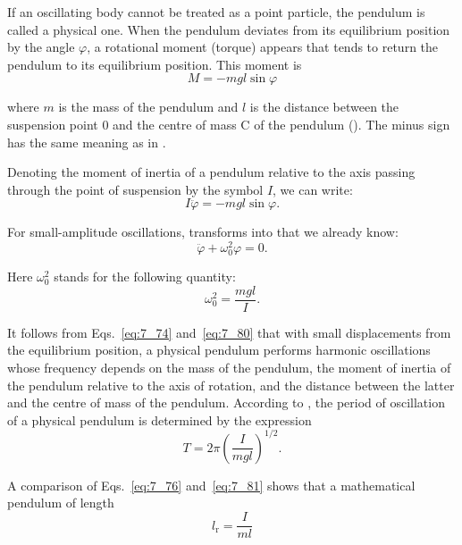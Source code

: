 If an oscillating body cannot be treated as a point particle, the pendulum is called a physical one. When the pendulum deviates from its equilibrium position by the angle $\varphi$, a rotational moment (torque) appears that tends to return the pendulum to its equilibrium position. This moment is
\begin{equation}\label{eq:7_78}
	M = -mgl\sin\varphi
\end{equation}

\noindent
where $m$ is the mass of the pendulum and $l$ is the distance between the suspension point $0$ and the centre of mass C of the pendulum (). The minus sign has the same meaning as in .

Denoting the moment of inertia of a pendulum relative to the axis passing through the point of suspension by the symbol $I$, we can write:
\begin{equation}\label{eq:7_79}
	I\ddot{\varphi} = -mgl\sin\varphi.
\end{equation}

\noindent
For small-amplitude oscillations,  transforms into  that we already know:
\begin{equation*}
	\ddot{\varphi} +\omega_0^2\varphi = 0.
\end{equation*}

\noindent
Here $\omega_0^2$ stands for the following quantity:
\begin{equation}\label{eq:7_80}
	\omega_0^2 = \frac{mgl}{I}.
\end{equation}

It follows from Eqs.~\eqref{eq:7_74} and~\eqref{eq:7_80} that with small displacements from the equilibrium position, a physical pendulum performs harmonic oscillations whose frequency depends on the mass of the pendulum, the moment of inertia of the pendulum relative to the axis of rotation, and the distance between the latter and the centre of mass of the pendulum. According to , the period of oscillation of a physical pendulum is determined by the expression
\begin{equation}\label{eq:7_81}
	T = 2\pi\left(\frac{I}{mgl}\right)^{1/2}.
\end{equation}

\noindent
A comparison of Eqs.~\eqref{eq:7_76} and~\eqref{eq:7_81} shows that a mathematical pendulum of length
\vspace{-12pt}
\begin{equation}\label{eq:7_82}
	l_{\text{r}} = \frac{I}{ml}
\end{equation}

